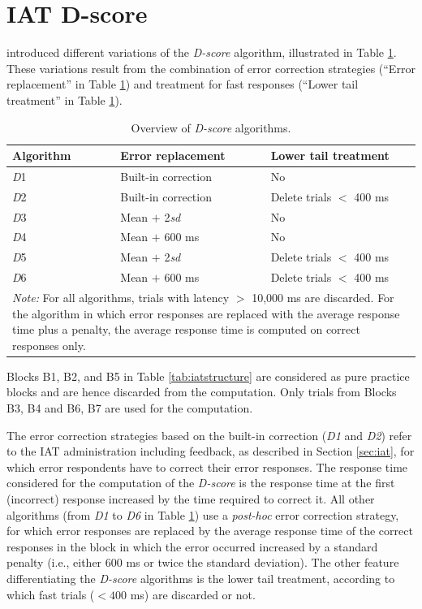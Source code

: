 \documentclass[12pt]{book}
\begin{document}
\section{IAT D-score}\label{sec:iatD}
 introduced different variations of the \emph{D-score} algorithm, illustrated in Table \ref{tab:Doverview}. These variations result from the combination of error correction strategies (``Error replacement'' in Table \ref{tab:Doverview}) and treatment for fast responses (``Lower tail treatment'' in Table \ref{tab:Doverview}).
\begin{table}[th!]
	\centering \doublespacing
	\caption{\label{tab:Doverview} Overview of \emph{D-score} algorithms. }
	\begin{tabular}{p{2cm}p{7cm}p{7cm}}
		\toprule
		Algorithm & Error replacement & Lower tail treatment\\\hline
		\emph{D}1 & Built-in correction & No \\
		\emph{D}2 & Built-in correction & Delete trials $<$ 400 ms \\
		\emph{D}3 & Mean $+$ 2\emph{sd} & No\\
		\emph{D}4 & Mean $+$ 600 ms & No \\
		\emph{D}5 & Mean $+$ 2\emph{sd} & Delete trials $<$ 400 ms\\
		\emph{D}6 & Mean $+$ 600 ms & Delete trials $<$ 400 ms \\
		\bottomrule
		\multicolumn{3}{p{16cm}}{\onehalfspacing\emph{Note:} For all algorithms, trials with latency $>$ 10,000 ms are discarded. For the algorithm in which error responses are replaced with the average response time plus a penalty, the average response time is computed on correct responses only.}
		\end{tabular}
	\end{table}

Blocks B1, B2, and B5 in Table \ref{tab:iatstructure} are considered as pure practice blocks and are hence discarded from the computation. Only trials from Blocks B3, B4 and B6, B7 are used for the computation.  

The error correction strategies based on the built-in correction (\emph{D1} and \emph{D2}) refer to the IAT administration including feedback, as described in Section \ref{sec:iat}, for which error respondents have to correct their error responses. The response time considered for the computation of the \emph{D-score} is the response time at the first (incorrect) response increased by the time required to correct it. All other algorithms (from \emph{D1} to \emph{D6} in Table \ref{tab:Doverview}) use a \emph{post-hoc} error correction strategy, for which error responses are replaced by the average response time of the correct responses in the block in which the error occurred increased by a standard penalty (i.e., either 600 ms or twice the standard deviation).
The other feature differentiating the \emph{D-score} algorithms is the lower tail treatment, according to which fast trials ($< 400$ ms) are discarded or not.
\end{document}
